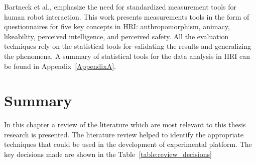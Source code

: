   
                                         
Bartneck et al., \cite{bartneck2009measurement} emphasize the need for standardized measurement tools for human robot interaction. This work presents measurements tools in the form of questionnaires for five key concepts in HRI: anthropomorphism, animacy, likeability, perceived intelligence, and perceived safety. All the evaluation techniques rely on the statistical tools for validating the results and generalizing the phenomena. A summary of statistical tools for the data analysis in HRI can be found in Appendix~\ref{AppendixA}.


\section{Summary}

In this chapter a review of the literature which are most relevant to this thesis research is presented. The literature review helped to identify the appropriate techniques that could be used in the development of experimental platform. The key decisions made are shown in the Table~\ref{table:review_decisions}

